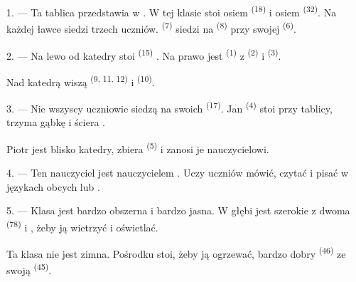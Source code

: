 \VUsaut{2.0mm}
\VUsaut{3.2mm}
\VUsaut{2.6mm}
\VUsaut{3.4mm}
\VUornamento{9pt}
\VUsaut{5.0mm}
\VUsaut{3.0mm}
\VUfilet{16mm}
\VUsaut{5.6mm}

\VUsaut{1.4mm}
\VUsaut{2.2mm}
\VUfilet{20mm}
\VUsaut{6.4mm}

\VUsaut{3.0mm}

1. --- Ta tablica przedstawia  w . W tej klasie stoi
osiem  \textsuperscript{(18)} i osiem  \textsuperscript{(32)}.
Na każdej ławce siedzi trzech uczniów.  \textsuperscript{(7)} siedzi na
 \textsuperscript{(8)} przy swojej  \textsuperscript{(6)}.

2. --- Na lewo od katedry stoi  \textsuperscript{(15)}
. Na prawo jest  \textsuperscript{(1)} z
 \textsuperscript{(2)} i  \textsuperscript{(3)}.

Nad katedrą wiszą  \textsuperscript{(9, 11, 12)} i
 \textsuperscript{(10)}.

3. --- Nie wszyscy uczniowie siedzą na swoich  \textsuperscript{(17)}.
Jan \textsuperscript{(4)} stoi przy tablicy, trzyma gąbkę i ściera
.

Piotr jest blisko katedry, zbiera  \textsuperscript{(5)} i
zanosi je nauczycielowi.

4. --- Ten nauczyciel jest nauczycielem . Uczy uczniów
mówić, czytać i pisać w językach obcych  lub .

5. --- Klasa jest bardzo obszerna i bardzo jasna. W głębi jest szerokie
 z dwoma  \textsuperscript{(78)} i
, żeby ją wietrzyć i oświetlać.

Ta klasa nie jest zimna. Pośrodku stoi, żeby ją ogrzewać, bardzo dobry
 \textsuperscript{(46)} ze swoją  \textsuperscript{(45)}.

